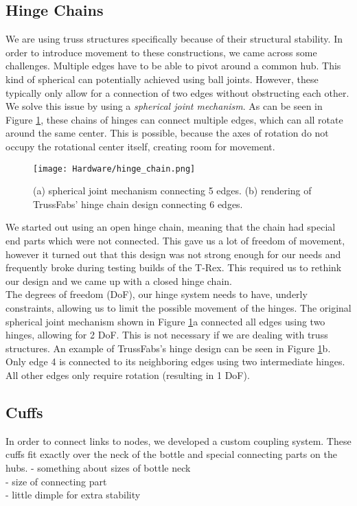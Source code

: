 \subsection{Hinge Chains}
We are using truss structures specifically because of their structural stability. In order to introduce movement to these constructions, we came across some challenges. Multiple edges have to be able to pivot around a common hub. This kind of spherical can potentially achieved using ball joints. However, these typically only allow for a connection of two edges without obstructing each other.\\
We solve this issue by using a \textit{spherical joint mechanism}. As can be seen in Figure \ref{fig:hinge_chain}, these chains of hinges can connect multiple edges, which can all rotate around the same center. This is possible, because the axes of rotation do not occupy the rotational center itself, creating room for movement.\\
\begin{figure}[h!]
    \texttt{[image: Hardware/hinge\_chain.png]}
    \centering
    \caption{(a) spherical joint mechanism connecting 5 edges. (b) rendering of TrussFabs' hinge chain design connecting 6 edges.}
    \label{fig:hinge_chain}
\end{figure}
We started out using an open hinge chain, meaning that the chain had special end parts which were not connected. This gave us a lot of freedom of movement, however it turned out that this design was not strong enough for our needs and frequently broke during testing builds of the T-Rex. This required us to rethink our design and we came up with a closed hinge chain.\\
The degrees of freedom (DoF), our hinge system needs to have, underly constraints, allowing us to limit the possible movement of the hinges. The original spherical joint mechanism shown in Figure \ref{fig:hinge_chain}a connected all edges using two hinges, allowing for 2 DoF. This is not necessary if we are dealing with truss structures. An example of TrussFabs's hinge design can be seen in Figure \ref{fig:hinge_chain}b. Only edge 4 is connected to its neighboring edges using two intermediate hinges. All other edges only require rotation (resulting in 1 DoF).\\


\subsection{Cuffs}
In order to connect links to nodes, we developed a custom coupling system. These cuffs fit exactly over the neck of the bottle and special connecting parts on the hubs.
- something about sizes of bottle neck\\
- size of connecting part\\
- little dimple for extra stability\\

